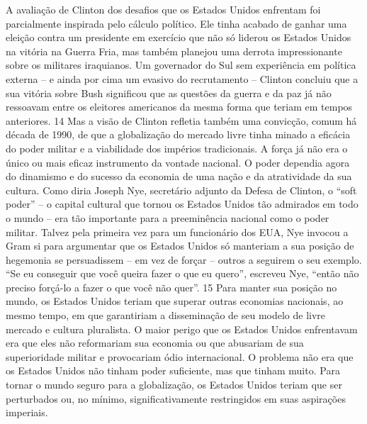 A avaliação de Clinton dos desafios que os Estados Unidos enfrentam foi parcialmente inspirada pelo cálculo político. Ele tinha acabado de ganhar uma eleição contra um presidente em exercício que não só liderou os Estados Unidos na vitória na Guerra Fria, mas também planejou uma derrota impressionante sobre os militares iraquianos. Um governador do Sul sem experiência em política externa – e ainda por cima um evasivo do recrutamento – Clinton concluiu que a sua vitória sobre Bush significou que as questões da guerra e da paz já não ressoavam entre os eleitores americanos da mesma forma que teriam em tempos anteriores.
 {\color{blue} 14}  
Mas a visão de Clinton refletia também uma convicção, comum há década de 1990, de que a globalização do mercado livre tinha minado a eficácia do poder militar e a viabilidade dos impérios tradicionais. A força já não era o único ou mais eficaz instrumento da vontade nacional. O poder dependia agora do dinamismo e do sucesso da economia de uma nação e da atratividade da sua cultura. Como diria Joseph Nye, secretário adjunto da Defesa de Clinton, o “soft poder” – o capital cultural que tornou os Estados Unidos tão admirados em todo o mundo – era tão importante para a preeminência nacional como o poder militar. Talvez pela primeira vez para um funcionário dos EUA, Nye invocou a Gram si para argumentar que os Estados Unidos só manteriam a sua posição de hegemonia se persuadissem – em vez de forçar – outros a seguirem o seu exemplo. “Se eu conseguir que você queira fazer o que eu quero”, escreveu Nye, “então não preciso forçá-lo a fazer o que você não quer”.
 {\color{blue} 15}  
Para manter sua posição no mundo, os Estados Unidos teriam que superar outras economias nacionais, ao mesmo tempo, em que garantiriam a disseminação de seu modelo de livre mercado e cultura pluralista. O maior perigo que os Estados Unidos enfrentavam era que eles não reformariam sua economia ou que abusariam de sua superioridade militar e provocariam ódio internacional. O problema não era que os Estados Unidos não tinham poder suficiente, mas que tinham muito. Para tornar o mundo seguro para a globalização, os Estados Unidos teriam que ser perturbados ou, no mínimo, significativamente restringidos em suas aspirações imperiais.
 
\par
 
